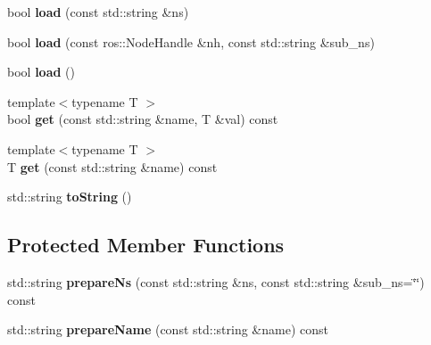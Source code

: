 \begin{DoxyCompactItemize}
\item 
bool {\bfseries load} (const std\+::string \&ns)\hypertarget{classow_1_1Parameter_ad323817f0a57331a208e0347b7384e37}{}\label{classow_1_1Parameter_ad323817f0a57331a208e0347b7384e37}

\item 
bool {\bfseries load} (const ros\+::\+Node\+Handle \&nh, const std\+::string \&sub\+\_\+ns)\hypertarget{classow_1_1Parameter_a6862c7ec9bc7203b9a3bb373af126579}{}\label{classow_1_1Parameter_a6862c7ec9bc7203b9a3bb373af126579}

\item 
bool {\bfseries load} ()\hypertarget{classow_1_1Parameter_a4dc84c89ea549ae37c17eb4f27c10ada}{}\label{classow_1_1Parameter_a4dc84c89ea549ae37c17eb4f27c10ada}

\item 
{\footnotesize template$<$typename T $>$ }\\bool {\bfseries get} (const std\+::string \&name, T \&val) const \hypertarget{classow_1_1Parameter_aa82fdc3e71145c2f957f397c82a8d202}{}\label{classow_1_1Parameter_aa82fdc3e71145c2f957f397c82a8d202}

\item 
{\footnotesize template$<$typename T $>$ }\\T {\bfseries get} (const std\+::string \&name) const \hypertarget{classow_1_1Parameter_a544effbbd6995b3a4532dcaba2c19c5e}{}\label{classow_1_1Parameter_a544effbbd6995b3a4532dcaba2c19c5e}

\item 
std\+::string {\bfseries to\+String} ()\hypertarget{classow_1_1Parameter_acd8f8e57b755e2f73d2143abbf68410e}{}\label{classow_1_1Parameter_acd8f8e57b755e2f73d2143abbf68410e}

\end{DoxyCompactItemize}
\subsection*{Protected Member Functions}
\begin{DoxyCompactItemize}
\item 
std\+::string {\bfseries prepare\+Ns} (const std\+::string \&ns, const std\+::string \&sub\+\_\+ns=\char`\"{}\char`\"{}) const \hypertarget{classow_1_1Parameter_a44bff8475f5260a6618c12f649161952}{}\label{classow_1_1Parameter_a44bff8475f5260a6618c12f649161952}

\item 
std\+::string {\bfseries prepare\+Name} (const std\+::string \&name) const \hypertarget{classow_1_1Parameter_a2672af9ffe32b48cc623e3364745d5c5}{}\label{classow_1_1Parameter_a2672af9ffe32b48cc623e3364745d5c5}

\end{DoxyCompactItemize}
